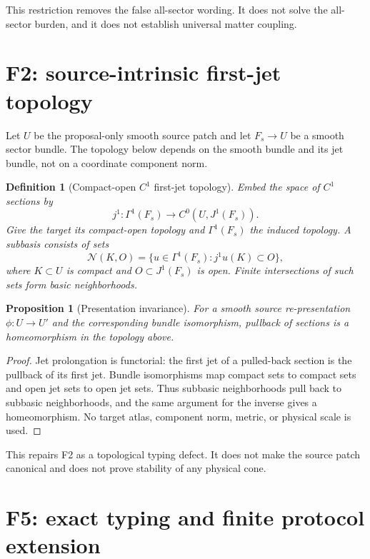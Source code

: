 \documentclass[11pt]{article}
\newtheorem{definition}{Definition}
\newtheorem{proposition}{Proposition}
\newcommand{\Jet}{J^1}
\begin{document}
This restriction removes the false all-sector wording.  It does not solve the
all-sector burden, and it does not establish universal matter coupling.

\section{F2: source-intrinsic first-jet topology}

Let \(U\) be the proposal-only smooth source patch and let
\(F_s\rightarrow U\) be a smooth sector bundle.  The topology below depends on
the smooth bundle and its jet bundle, not on a coordinate component norm.

\begin{definition}[Compact-open \(C^1\) first-jet topology]
Embed the space of \(C^1\) sections by
\[
 j^1:\Gamma^1(F_s)\longrightarrow C^0\!\left(U,\Jet(F_s)\right).
\]
Give the target its compact-open topology and \(\Gamma^1(F_s)\) the induced
topology.  A subbasis consists of sets
\[
 \mathcal N(K,O)=\{u\in\Gamma^1(F_s):j^1u(K)\subset O\},
\]
where \(K\subset U\) is compact and \(O\subset\Jet(F_s)\) is open.  Finite
intersections of such sets form basic neighborhoods.
\end{definition}

\begin{proposition}[Presentation invariance]
For a smooth source re-presentation \(\phi:U\to U'\) and the corresponding
bundle isomorphism, pullback of sections is a homeomorphism in the topology
above.
\end{proposition}

\begin{proof}
Jet prolongation is functorial: the first jet of a pulled-back section is the
pullback of its first jet.  Bundle isomorphisms map compact sets to compact
sets and open jet sets to open jet sets.  Thus subbasic neighborhoods pull
back to subbasic neighborhoods, and the same argument for the inverse gives a
homeomorphism.  No target atlas, component norm, metric, or physical scale is
used.
\end{proof}

This repairs F2 as a topological typing defect.  It does not make the source
patch canonical and does not prove stability of any physical cone.

\section{F5: exact typing and finite protocol extension}
\end{document}
